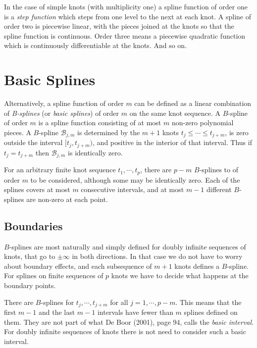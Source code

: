 \documentclass[
  12pt,
]{article}
\begin{document}
In the case of simple knots (with multiplicity one) a spline function of
order one is a \emph{step function} which steps from one level to the
next at each knot. A spline of order two is piecewise linear, with the
pieces joined at the knots so that the spline function is continuous.
Order three means a piecewise quadratic function which is continuously
differentiable at the knots. And so on.

\hypertarget{basic-splines}{%
\section{Basic Splines}\label{basic-splines}}

Alternatively, a spline function of order \(m\) can be defined as a
linear combination of \emph{B-splines} (or \emph{basic splines}) of
order \(m\) on the same knot sequence. A \(B\)-spline of order \(m\) is
a spline function consisting of at most \(m\) non-zero polynomial
pieces. A \(B\)-spline \(\mathcal{B}_{j,m}\) is determined by the
\(m+1\) knots \(t_j\leq\cdots\leq t_{j+m}\), is zero outside the
interval \([t_j,t_{j+m})\), and positive in the interior of that
interval. Thus if \(t_j=t_{j+m}\) then \(\mathcal{B}_{j,m}\) is
identically zero.

For an arbitrary finite knot sequence \(t_1,\cdots,t_p\), there are
\(p-m\) \(B\)-splines to of order \(m\) to be considered, although some
may be identically zero. Each of the splines covers at most \(m\)
consecutive intervals, and at most \(m-1\) different \(B\)-splines are
non-zero at each point.

\hypertarget{boundaries}{%
\subsection{Boundaries}\label{boundaries}}

\(B\)-splines are most naturally and simply defined for doubly infinite
sequences of knots, that go to \(\pm\infty\) in both directions. In that
case we do not have to worry about boundary effects, and each
subsequence of \(m+1\) knots defines a \(B\)-spline. For splines on
finite sequences of \(p\) knots we have to decide what happens at the
boundary points.

There are \(B\)-splines for \(t_j,\cdots,t_{j+m}\) for all
\(j=1,\cdots,p-m\). This means that the first \(m-1\) and the last
\(m-1\) intervals have fewer than \(m\) splines defined on them. They
are not part of what De Boor (2001), page 94, calls the \emph{basic
interval}. For doubly infinite sequences of knots there is not need to
consider such a basic interval.
\end{document}
